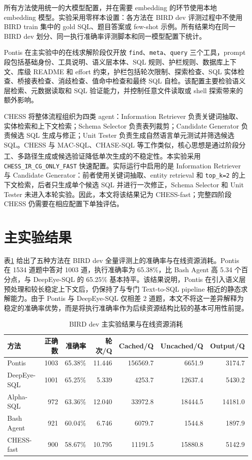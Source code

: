 \documentclass[
    bachelor,
    pdflinks,
]{xjtuthesis}
\newcommand{\upcite}[1]{\textsuperscript{\cite{#1}}}
\newcommand{\topcaption}[1]{\caption{#1}}
\begin{document}
所有方法使用统一的大模型配置，并在需要 embedding 的环节使用本地 embedding 模型。实验采用零样本设置：各方法在 BIRD dev 评测过程中不使用 BIRD train 集中的 gold SQL、题目答案或 few-shot 示例。所有结果均在同一 BIRD dev 划分、同一执行准确率评测脚本和同一模型配置下统计。

Pontis 在主实验中的在线求解阶段仅开放 \texttt{find}、\texttt{meta}、\texttt{query} 三个工具，prompt 段包括基础身份、工具说明、语义层本体、SQL 规则、护栏规则、数据库上下文、库级 README 和 effort 约束，护栏包括轮次限制、探索检查、SQL 实体检查、桥接表检查、消歧检查、值命中检查和最终 SQL 自检。该配置主要检验语义层检索、元数据读取和 SQL 验证能力，并控制任意文件读取或 shell 探索带来的额外影响。

CHESS 将整体流程组织为四类 agent：Information Retriever 负责关键词抽取、实体检索和上下文检索；Schema Selector 负责表列裁剪；Candidate Generator 负责候选 SQL 生成与修正；Unit Tester 负责生成自然语言单元测试并筛选候选 SQL。CHESS 与 MAC-SQL、CHASE-SQL 等工作类似，核心思想是通过阶段分工、多路径生成或候选验证降低单次生成的不稳定性\upcite{wang2025macsql,pourreza2024chasesql}。本实验采用 \texttt{CHESS\_IR\_CG\_ONLY\_FAST} 快速配置。实际运行中启用的是 Information Retriever 与 Candidate Generator：前者使用关键词抽取、entity retrieval 和 \texttt{top\_k=2} 的上下文检索，后者只生成单个候选 SQL 并进行一次修正，Schema Selector 和 Unit Tester 未进入本轮实验。因此，本文将该结果记为 CHESS-fast；完整四阶段 CHESS 仍需要在相应配置下单独评估。

\section{主实验结果}

表\ref{tab:main_results} 给出了五种方法在 BIRD dev 全量评测上的准确率与在线资源消耗。Pontis 在 1534 道题中答对 1003 道，执行准确率为 65.38\%，比 Bash Agent 高 5.34 个百分点，与 DeepEye-SQL 的 65.25\% 基本持平。该结果说明，Pontis 在引入语义层预处理和较长稳定上下文后，仍保持了与专门 Text-to-SQL pipeline 相近的静态求解能力。由于 Pontis 与 DeepEye-SQL 仅相差 2 道题，本文不将这一差异解释为稳定的准确率优势，而是将执行准确率作为后续资源结构比较的基本可用性前提。

\begin{table}[htbp]\small
  \centering
  \topcaption{BIRD dev 主实验结果与在线资源消耗}
  \label{tab:main_results}
  \begin{tabular}{lrrrrrr}
    \toprule[1.5pt]
    \textbf{方法} & \textbf{正确数} & \textbf{准确率} & \textbf{轮次/Q} & \textbf{Cached/Q} & \textbf{Uncached/Q} & \textbf{Output/Q} \\
    \midrule[1pt]
    Pontis & 1003 & 65.38\% & 11.446 & 156569.7 & 6651.9 & 3174.7 \\
    DeepEye-SQL & 1001 & 65.25\% & 5.339 & 4253.7 & 12637.4 & 5430.2 \\
    Alpha-SQL & 972 & 63.36\% & 12.040 & 33972.8 & 18444.5 & 14181.0 \\
    Bash Agent & 921 & 60.04\% & 6.746 & 6079.7 & 1544.8 & 1897.9 \\
    CHESS-fast & 900 & 58.67\% & 10.795 & 11191.5 & 15880.8 & 5142.9 \\
    \bottomrule[1.5pt]
  \end{tabular}
\end{table}
\end{document}
